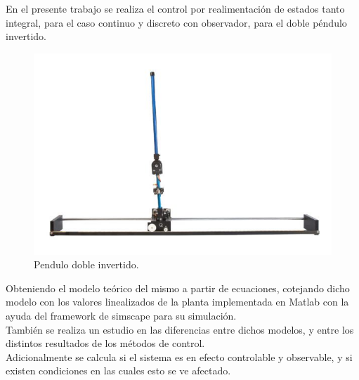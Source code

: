 %
%
%
En el presente trabajo se realiza el control por realimentación de estados tanto integral, para el caso continuo y discreto con observador, para el doble péndulo invertido. 

\begin{figure}[H]
	\centering
	\includegraphics[width=\linewidth]{ImagenesResumen/base}
	\caption{Pendulo doble invertido.}	
	\label{fig:pend}
\end{figure}
Obteniendo el modelo teórico del mismo a partir de ecuaciones, cotejando dicho modelo con los valores linealizados de la planta implementada en Matlab con la ayuda del framework de simscape para su simulación.\\
También se realiza un estudio en las diferencias entre dichos modelos, y entre los distintos resultados de los métodos de control.
\\
Adicionalmente se calcula si el sistema es en efecto controlable y observable, y si existen condiciones en las cuales esto se ve afectado.

%